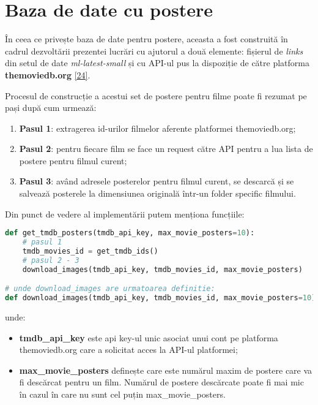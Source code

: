 \section{Baza de date cu postere}
În ceea ce privește baza de date pentru postere, aceasta a fost construită în cadrul dezvoltării prezentei lucrări cu ajutorul a două elemente: fișierul de \textit{links} din setul de date \textit{ml-latest-small} și cu API-ul pus la dispoziție de către platforma \textbf{themoviedb.org} \hyperlink{themoviedb}{[24]}.

Procesul de construcție a acestui set de postere pentru filme poate fi rezumat pe pași după cum urmează:
\begin{enumerate}
	\item \textbf{Pasul 1}: extragerea id-urilor filmelor aferente platformei themoviedb.org;
	\item \textbf{Pasul 2}: pentru fiecare film se face un request către API pentru a lua lista de postere pentru filmul curent;
	\item \textbf{Pasul 3}: având adresele posterelor pentru filmul curent, se descarcă și se salvează posterele la dimensiunea originală într-un folder specific filmului.
\end{enumerate}
Din punct de vedere al implementării putem menționa funcțiile:
\begin{lstlisting}[language=Python, caption=\textit{Construcția setului de date cu postere}]
def get_tmdb_posters(tmdb_api_key, max_movie_posters=10):
    # pasul 1    
    tmdb_movies_id = get_tmdb_ids()
    # pasul 2 - 3
    download_images(tmdb_api_key, tmdb_movies_id, max_movie_posters)

# unde download_images are urmatoarea definitie:
def download_images(tmdb_api_key, tmdb_movies_id, max_movie_posters=10):
\end{lstlisting}
unde:
\begin{itemize}
	\item \textbf{tmdb\_api\_key} este api key-ul unic asociat unui cont pe platforma themoviedb.org care a solicitat acces la API-ul platformei;
	\item \textbf{max\_movie\_posters} definește care este numărul maxim de postere care va fi descărcat pentru un film. Numărul de postere descărcate poate fi mai mic în cazul în care nu sunt cel puțin max\_movie\_posters.
\end{itemize}

